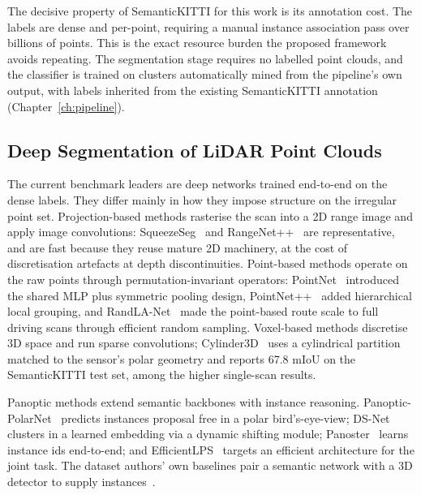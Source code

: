 The decisive property of SemanticKITTI for this work is its annotation cost. The labels
are dense and per-point, requiring a manual instance association pass over billions of
points. This is the exact resource burden the proposed framework avoids repeating. The
segmentation stage requires no labelled point clouds, and the classifier is trained on
clusters automatically mined from the pipeline's own output, with labels inherited from the
existing SemanticKITTI annotation (Chapter~\ref{ch:pipeline}).

\subsection{Deep Segmentation of LiDAR Point Clouds}
\label{sec:bg-deep}

The current benchmark leaders are deep networks trained end-to-end on the dense labels.
They differ mainly in how they impose structure on the irregular point set.
Projection-based methods rasterise the scan into a 2D range image and apply
image convolutions: SqueezeSeg~\cite{10.1109/ICRA.2018.8462926} and
RangeNet++~\cite{milioto2019rangenet++} are representative, and are fast because they
reuse mature 2D machinery, at the cost of discretisation artefacts at depth
discontinuities. Point-based methods operate on the raw points through
permutation-invariant operators: PointNet~\cite{Qi_2017_CVPR} introduced the
shared MLP plus symmetric pooling design, PointNet++~\cite{NIPS2017_d8bf84be} added
hierarchical local grouping, and RandLA-Net~\cite{Hu_2020_CVPR} made the point-based
route scale to full driving scans through efficient random sampling. Voxel-based
methods discretise 3D space and run sparse convolutions; Cylinder3D~\cite{zhu2021cylindrical}
uses a cylindrical partition matched to the sensor's polar geometry and reports
\num{67.8} mIoU on the SemanticKITTI test set, among the higher single-scan results.

Panoptic methods extend semantic backbones with instance reasoning.
Panoptic-PolarNet~\cite{zhou2021panopticpolarnet} predicts instances proposal free in a
polar bird's-eye-view; DS-Net~\cite{hong2021dsnet} clusters in a learned embedding via a
dynamic shifting module; Panoster~\cite{gasperini2021panoster} learns instance ids
end-to-end; and EfficientLPS~\cite{sirohi2021efficientlps} targets an efficient
architecture for the joint task. The dataset authors' own baselines pair a semantic
network with a 3D detector to supply instances~\cite{behley2021panoptic}.

